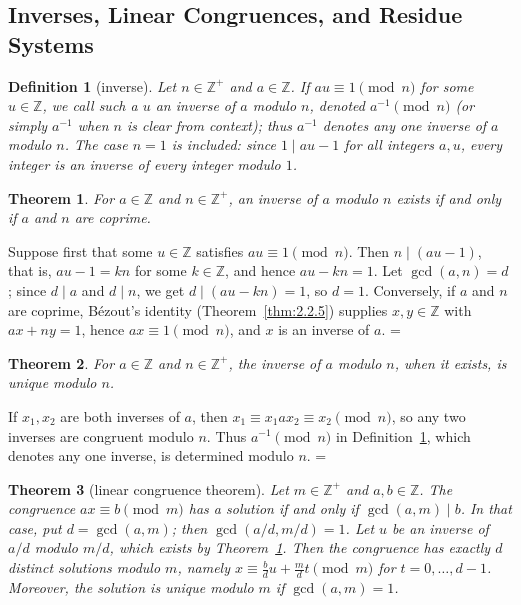 \documentclass[11pt]{article}
\makeatletter
\theoremstyle{ntstyle}
\newtheorem{theorem}{Theorem}[subsection]
\newtheorem{definition}{Definition}[subsection]
\let\nt@closedisplay\]
\def\nt@guardedclose{\@ifnextchar\par{\nt@closeafterpar}{\@ifnextchar\end{\postdisplaypenalty\@M\nt@closedisplay}{\nt@closedisplay}}}
\def\nt@closeafterpar\par{\@ifnextchar\par{\nt@closeafterpar}{\@ifnextchar\end{\postdisplaypenalty\@M\nt@closedisplay\par}{\nt@closedisplay\par}}}
\renewenvironment{proof}[1][\proofname]{\par
  \pushQED{\qed}\normalfont\topsep\medskipamount\edef\nt@afterproof{\@endparpenalty=\the\@endparpenalty\relax}\@beginparpenalty\@M\@endparpenalty\@M\let\]\nt@guardedclose\trivlist\item[]\textit{#1\@addpunct{.}} \ignorespaces}{\ifvmode\addpenalty\@M\fi\popQED\nt@afterproof\endtrivlist\@endpefalse}
\makeatother
\begin{document}
\subsection{Inverses, Linear Congruences, and Residue Systems}

\begin{definition}[inverse]\label{def:3.2.1} Let $n \in
		\mathbb{Z}^+$ and $a \in \mathbb{Z}$. If
	$au \equiv 1 \pmod{n}$ for some $u \in \mathbb{Z}$, we call such a $u$ an inverse of $a$ modulo
	$n$, denoted $a^{-1} \pmod{n}$ (or simply $a^{-1}$ when
	$n$ is clear from context); thus $a^{-1}$ denotes any one inverse of $a$ modulo $n$.
	The case $n=1$ is included: since $1\mid au-1$ for all integers $a,u$,
	every integer is an inverse of every integer modulo $1$.
\end{definition}
\begin{theorem}\label{thm:3.2.1} For $a \in \mathbb{Z}$ and $n\in\mathbb{Z}^+$, an inverse of
	$a$ modulo $n$ exists if and only if $a$ and $n$ are coprime.
\end{theorem}

\begin{proof} Suppose first that some $u \in \mathbb{Z}$ satisfies
	$au \equiv 1 \pmod{n}$. Then $n \mid (au - 1)$, that is, $au - 1 = kn$
	for some $k \in \mathbb{Z}$, and hence $au - kn = 1$. Let $\gcd(a, n) =
		d$; since $d \mid a$ and $d \mid n$, we get $d \mid (au - kn) = 1$, so
	$d = 1$. Conversely, if $a$
	and $n$ are coprime, B{\'e}zout's identity (Theorem~\ref{thm:2.2.5}) supplies $x, y \in
		\mathbb{Z}$ with $ax + ny = 1$, hence $ax \equiv 1 \pmod{n}$,
	and $x$ is an inverse of $a$.
\end{proof}
\begin{theorem}\label{thm:3.2.2} For $a \in \mathbb{Z}$ and $n\in\mathbb{Z}^+$, the inverse of
	$a$ modulo $n$, when it exists, is unique modulo $n$.
\end{theorem}

\begin{proof} If $x_1, x_2$ are both inverses of $a$,
	then $x_1 \equiv x_1 a x_2 \equiv x_2 \pmod{n}$, so any two inverses are congruent modulo $n$.
	Thus $a^{-1} \pmod{n}$ in Definition~\ref{def:3.2.1}, which denotes any one inverse, is
	determined modulo $n$.
\end{proof}
\begin{theorem}[linear congruence theorem]\label{thm:3.2.3} Let $m \in \mathbb{Z}^+$ and $a, b \in \mathbb{Z}$. The congruence $ax \equiv
		b \pmod{m}$ has a solution if and only if $\gcd(a, m) \mid b$. In that case, put $d=\gcd(a,m)$;
		then $\gcd(a/d,m/d)=1$. Let $u$ be an inverse of $a/d$ modulo $m/d$,
	which exists by Theorem~\ref{thm:3.2.1}. Then the congruence has exactly $d$
	distinct solutions modulo $m$, namely
	$x\equiv\tfrac{b}{d}u+\tfrac{m}{d}t\pmod{m}$ for
	$t=0,\ldots,d-1$.
	Moreover, the solution is unique modulo $m$ if $\gcd(a, m) = 1$.
\end{theorem}
\end{document}

